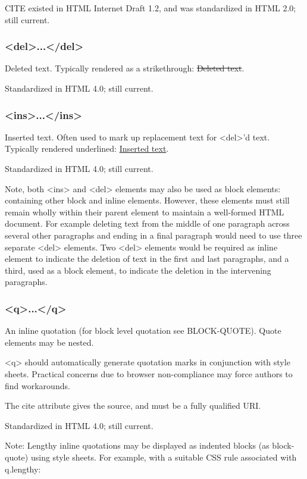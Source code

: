 CITE existed in HTML Internet Draft 1.2, and was standardized in HTML 2.0; still current.


\subsubsection{<del>...</del>}

Deleted text. Typically rendered as a strikethrough: \sout{Deleted text}.

Standardized in HTML 4.0; still current.


\subsubsection{<ins>...</ins>}

Inserted text. Often used to mark up replacement text for <del>'d text. Typically rendered underlined: \uline{Inserted text}.

Standardized in HTML 4.0; still current.

Note, both <ins> and <del> elements may also be used as block elements: containing other block and inline elements. However, these elements must still remain wholly within their parent element to maintain a well-formed HTML document. For example deleting text from the middle of one paragraph across several other paragraphs and ending in a final paragraph would need to use three separate <del> elements. Two <del> elements would be required as inline element to indicate the deletion of text in the first and last paragraphs, and a third, used as a block element, to indicate the deletion in the intervening paragraphs.


\subsubsection{<q>...</q>}


An inline quotation (for block level quotation see BLOCK-QUOTE). Quote elements may be nested.

<q> should automatically generate quotation marks in conjunction with style sheets. Practical concerns due to browser non-compliance may force authors to find workarounds.

The cite attribute gives the source, and must be a fully qualified URI.

Standardized in HTML 4.0; still current.

Note: Lengthy inline quotations may be displayed as indented blocks (as block-quote) using style sheets. For example, with a suitable CSS rule associated with q.lengthy:

